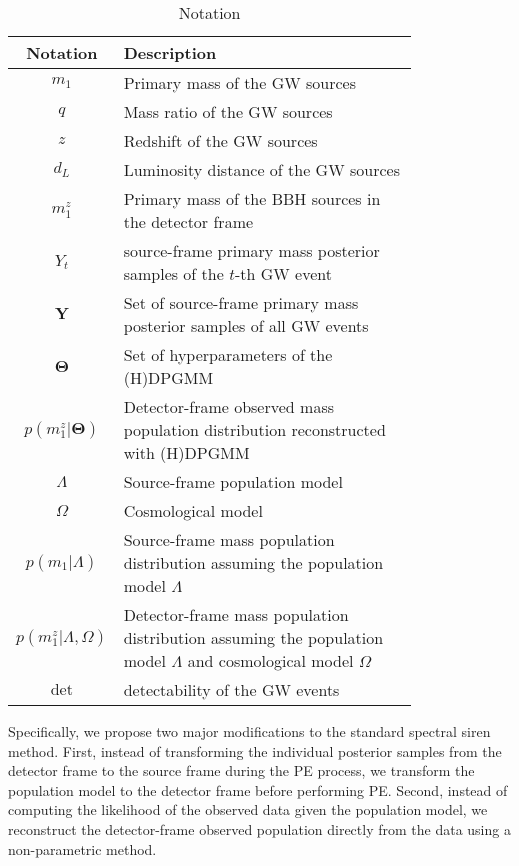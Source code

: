 \documentclass[aps,prd,twocolumn,superscriptaddress,preprintnumbers,nofootinbib,hidelinks]{revtex4-2}
\begin{document}
\begin{table}
    \label{tab:notation}
    \caption{Notation}
    \begin{ruledtabular}
        \begin{tabular}{c>{\raggedright\arraybackslash}p{0.8\linewidth}}
            Notation & Description \\
            \hline
            $m_1$ & Primary mass of the \ac{GW} sources \\
            $q$ & Mass ratio of the \ac{GW} sources \\
            $z$ & Redshift of the \ac{GW} sources \\
            $d_L$ & Luminosity distance of the \ac{GW} sources \\
            $m^z_1$ & Primary mass of the \ac{BBH} sources in the detector frame \\
            $Y_t$ & source-frame primary mass posterior samples of the $t$-th \ac{GW} event \\
            $\mathbf{Y}$ & Set of source-frame primary mass posterior samples of all \ac{GW} events \\
            $\mathbf{\Theta}$ & Set of hyperparameters of the \ac{(H)DPGMM} \\
            $p(m^z_1|\mathbf{\Theta})$ & Detector-frame observed mass population distribution reconstructed with \ac{(H)DPGMM} \\
            $\Lambda$ & Source-frame population model \\
            $\Omega$ & Cosmological model \\
            $p(m_1|\Lambda)$ & Source-frame mass population distribution assuming the population model $\Lambda$ \\
            $p(m^z_1|\Lambda, \Omega)$ & Detector-frame mass population distribution assuming the population model $\Lambda$ and cosmological model $\Omega$ \\
            $\mathrm{det}$ & detectability of the \ac{GW} events \\
        \end{tabular}
        \end{ruledtabular}
\end{table}

Specifically, we propose two major modifications to the standard spectral siren method.
First, instead of transforming the individual posterior samples from the detector frame to the source frame during the \ac{PE} process, we transform the population model to the detector frame before performing \ac{PE}.
Second, instead of computing the likelihood of the observed data given the population model, we reconstruct the detector-frame observed population directly from the data using a non-parametric method.
\end{document}
